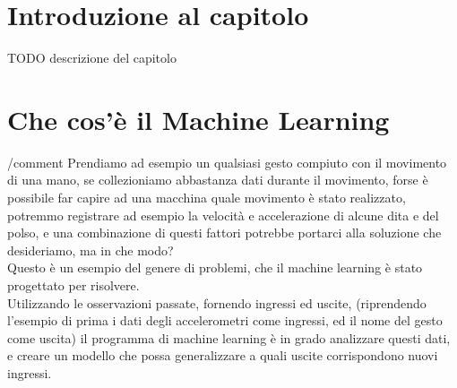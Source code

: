 

\newcommand{\comment}[1]{}
\newcommand{\myBigBreak}{\\[5mm]}


\label{01-chapter}


\section{Introduzione al capitolo} \label{sezione 1-1}
TODO descrizione del capitolo\par





\section{Che cos'è il Machine Learning} \label{sezione 1-2}
\comment{
Imagine you own a machine that manufactures widgets. Sometimes it breaks down,
and it’s expensive to repair. Perhaps if you collected data about the machine during
operation, you might be able to predict when it is about to break down and halt oper‐
ation before damage occurs. For instance, you could record its rate of production, its
temperature, and how much it is vibrating. It might be that some combination of
these factors indicates an impending problem. But how do you figure it out?
This is an example of the sort of problem machine learning is designed to solve. Fun‐
damentally, machine learning is a technique for using computers to predict things
based on past observations. We collect data about our factory machine’s performance
and then create a computer program that analyzes that data and uses it to predict
future states.
}
/comment{
Prendiamo ad esempio un qualsiasi gesto compiuto con il movimento di una mano, se collezioniamo abbastanza dati durante il movimento, forse è possibile far capire ad una macchina quale movimento è stato realizzato, \comment{ovvero classificare i dati raccolti con uno specifico label, ad esempio tenendo il pollice alzato e il resto della mano chiusa a pugno potremmo ricevere un label "OK", oppure tenendo la mano aperta e scuotendola ricevere "CIAO",} potremmo registrare ad esempio la velocità e accelerazione di alcune dita e del polso, e una combinazione di questi fattori potrebbe portarci alla soluzione che desideriamo, ma in che modo?\\
Questo è un esempio del genere di problemi, che il machine learning è stato progettato per risolvere.\\
Utilizzando le osservazioni passate, fornendo ingressi ed uscite, (riprendendo l'esempio di prima i dati degli accelerometri come ingressi, ed il nome del gesto come uscita) il programma di machine learning è in grado analizzare questi dati, e creare un modello che possa generalizzare a quali uscite corrispondono nuovi ingressi. 
\myBigBreak
}

